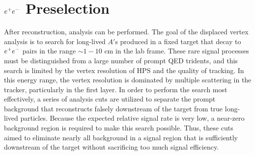 \clearpage

\section{$e^{+}e^{-}$ Preselection}\label{sec:preselection}

After reconstruction, analysis can be performed. The goal of the displaced vertex analysis is to search for long-lived $A'$s produced in a fixed target that decay to $e^{+}e^{-}$ pairs in the range $\sim 1-10$ cm in the lab frame. These rare signal processes must be distinguished from a large number of prompt QED tridents, and this search is limited by the vertex resolution of HPS and the quality of tracking. In this energy range, the vertex resolution is dominated by multiple scattering in the tracker, particularly in the first layer. In order to perform the search most effectively, a series of analysis cuts are utilized to separate the prompt background that reconstructs falsely downstream of the target from true long-lived particles. Because the expected relative signal rate is very low, a near-zero background region is required to make this search possible. Thus, these cuts aimed to eliminate nearly all background in a signal region that is sufficiently downstream of the target without sacrificing too much signal efficiency.



